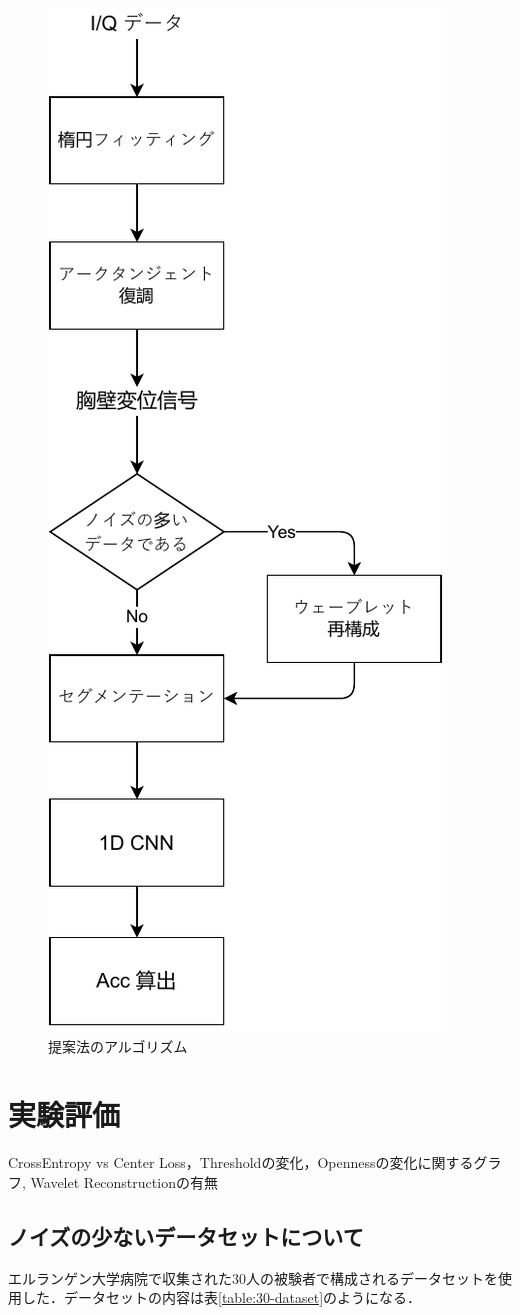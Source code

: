 \begin{figure}[H]
\begin{center}
\includegraphics[width=0.5\linewidth]{./fig/proposed_method.pdf}
\end{center}
\caption{提案法のアルゴリズム}
\label{fig:proposed_method}
\end{figure}

\chapter{実験評価}
CrossEntropy vs Center Loss，Thresholdの変化，Opennessの変化に関するグラフ, Wavelet Reconstructionの有無
\section{ノイズの少ないデータセットについて}
エルランゲン大学病院で収集された30人の被験者で構成されるデータセットを使用した．データセットの内容は表\ref{table:30-dataset}のようになる．


